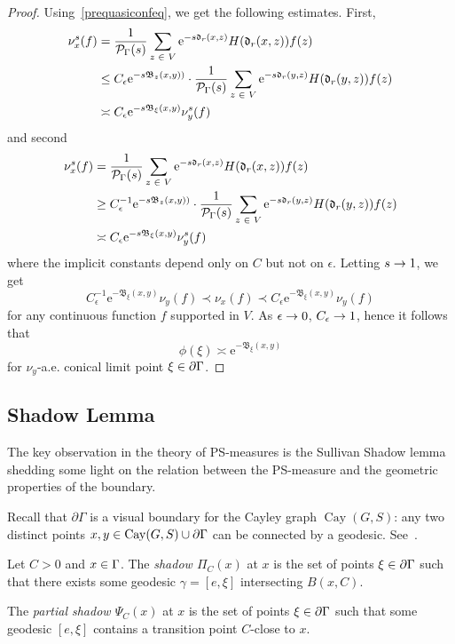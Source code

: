 \documentclass[AHL,Unicode,longabstracts]{cedram}
\newcommand{\pG}{\partial{\Gamma}}
\newcommand{\rme}{\mathrm{e}}
\newcommand{\fkd}{\mathfrak{d}}
\newcommand{\fkB}{\mathfrak{B}}
\newcommand{\clP}{\mathcal{P}}
\DeclareMathOperator{\Cay}{Cay}
\let\oldin\in
\renewcommand{\in}{\mathchoice{\oldin}{\oldin}{\,\oldin\,}{\,\oldin\,}}
\renewcommand*{\to}{\mathchoice{\longrightarrow}{\rightarrow}{\rightarrow}{\rightarrow}}
\begin{document}
\begin{proof}
Using~\eqref{prequasiconfeq}, we get the following estimates. First,
\begin{align*}
\nu^s_x(f) & = \frac{1}{\clP_{\Gamma}(s)} \sum\limits_{z \in V}
\rme^{-s \fkd_r(x,z)} H(\fkd_r(x,z)) {f(z)} \\
& \leq C_\epsilon \rme^{-s\fkB_{z}(x, y))}\cdot \frac{1}{\clP_{\Gamma}(s)}
\sum\limits_{z \in V}
\rme^{-s\fkd_r(y, z)} H(\fkd_r(y, z)) {f(z)}\\
& \asymp C_\epsilon \rme^{-s\fkB_\xi(x, y)} \nu^s_y(f)
\end{align*}
and second
\begin{align*}
\nu^s_x(f) & = \frac{1}{\clP_{\Gamma}(s)} \sum\limits_{z \in V}
\rme^{-s \fkd_r(x,z)} H(\fkd_r(x,z)) {f(z)} \\
& \geq C_\epsilon^{-1} \rme^{-s\fkB_{z}(x, y))}\cdot \frac{1}{\clP_{\Gamma}(s)}
\sum\limits_{z \in V}
\rme^{-s\fkd_r(y, z)} H(\fkd_r(y, z)) {f(z)}\\
& \asymp C_\epsilon \rme^{-s\fkB_\xi(x, y)} \nu^s_y(f)
\end{align*}
where the implicit constants depend only on $C$ but not on $\epsilon$. Letting $s\to 1$, we get
\[
C_\epsilon^{-1} \rme^{-\fkB_\xi(x, y)}\nu_y(f)\prec \nu_x(f) \prec C_\epsilon \rme^{-\fkB_\xi(x, y)} \nu_y(f)
\]
for any continuous function $f$ supported in $V$. As $\epsilon\to 0$, $C_\epsilon\to 1$, hence it follows that
\[
\phi(\xi) \asymp \rme^{-
\fkB_\xi (x, y)}
\]
for $\nu_y$-a.e. conical limit point $\xi \in \pG$.
\end{proof}

\subsection{Shadow Lemma}

The key observation in the theory of PS-measures is the Sullivan Shadow lemma shedding some light on the relation between the PS-measure and the geometric properties of the boundary.

Recall that $\partial \Gamma$ is a visual boundary for the Cayley graph $\Cay(G,S)$: any two distinct points $x,y\in \Cay(G,S)\cup \partial \Gamma$ can be connected by a geodesic. See~\cite[Proposition~2.4]{GePoJEMS}.

\begin{defi}
Let $C>0$ and $x \in\Gamma$. The \emph{shadow $\Pi_C(x)$} at $x$ is the set of points $\xi \in \pG$ such that there exists some geodesic $\gamma=[e, \xi]$ intersecting $B(x, C)$.

The \emph{partial shadow $ \Psi_{C}(x)$} at $x$ is the set of points $\xi \in \pG$ such that some geodesic $[e,\xi]$ contains a transition point $C$-close to $x$.
\end{defi}
\end{document}
